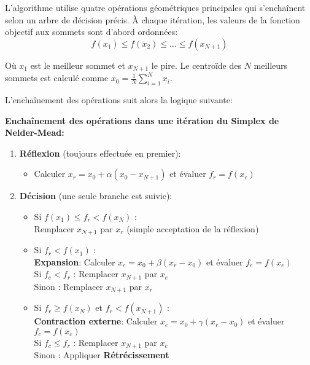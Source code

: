L'algorithme utilise quatre opérations géométriques principales qui s'enchaînent selon un arbre de décision précis. À chaque itération, les valeurs de la fonction objectif aux sommets sont d'abord ordonnées:
\begin{equation}\label{eq:ordre_simplex}
f(x_1) \leq f(x_2) \leq \ldots \leq f(x_{N+1})
\end{equation}

Où $x_1$ est le meilleur sommet et $x_{N+1}$ le pire. Le centroïde des $N$ meilleurs sommets est calculé comme $x_0 = \frac{1}{N}\sum_{i=1}^{N}x_i$.

L'enchaînement des opérations suit alors la logique suivante:

\noindent\textbf{Enchaînement des opérations dans une itération du Simplex de Nelder-Mead:}

\begin{enumerate}
\item \textbf{Réflexion} (toujours effectuée en premier):
   \begin{itemize}
   \item Calculer $x_r = x_0 + \alpha(x_0 - x_{N+1})$ et évaluer $f_r = f(x_r)$
   \end{itemize}

\item \textbf{Décision} (une seule branche est suivie):
   \begin{itemize}
   \item Si $f(x_1) \leq f_r < f(x_N)$ : \\
         Remplacer $x_{N+1}$ par $x_r$ (simple acceptation de la réflexion)
   
   \item Si $f_r < f(x_1)$ : \\
         \textbf{Expansion}: Calculer $x_e = x_0 + \beta(x_r - x_0)$ et évaluer $f_e = f(x_e)$ \\
         Si $f_e < f_r$ : Remplacer $x_{N+1}$ par $x_e$ \\
         Sinon : Remplacer $x_{N+1}$ par $x_r$
   
   \item Si $f_r \geq f(x_N)$ et $f_r < f(x_{N+1})$ : \\
         \textbf{Contraction externe}: Calculer $x_c = x_0 + \gamma(x_r - x_0)$ et évaluer $f_c = f(x_c)$ \\
         Si $f_c \leq f_r$ : Remplacer $x_{N+1}$ par $x_c$ \\
         Sinon : Appliquer \textbf{Rétrécissement}
   

\end{itemize}
\end{enumerate}
